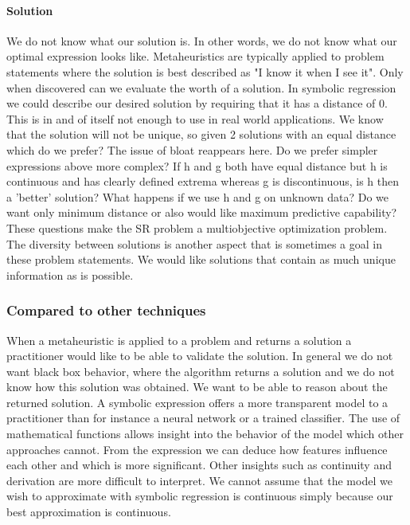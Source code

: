 \paragraph{Solution}
We do not know what our solution is. In other words, we do not know what our optimal expression looks like. Metaheuristics are typically applied to problem statements where the solution is best described as "I know it when I see it". Only when discovered can we evaluate the worth of a solution. In symbolic regression we could describe our desired solution by requiring that it has a distance of 0. This is in and of itself not enough to use in real world applications. We know that the solution will not be unique, so given 2 solutions with an equal distance which do we prefer? The issue of bloat reappears here. Do we prefer simpler expressions above more complex? If h and g both have equal distance but h is continuous and has clearly defined extrema whereas g is discontinuous, is h then a 'better' solution? What happens if we use h and g on unknown data? Do we want only minimum distance or also would like maximum predictive capability? These questions make the SR problem a multiobjective optimization problem. The diversity between solutions is another aspect that is sometimes a goal in these problem statements. We would like solutions that contain as much unique information as is possible. 

\subsubsection{Compared to other techniques}
When a metaheuristic is applied to a problem and returns a solution a practitioner would like to be able to validate the solution. In general we do not want black box behavior, where the algorithm returns a solution and we do not know how this solution was obtained. We want to be able to reason about the returned solution. A symbolic expression offers a more transparent model to a practitioner than for instance a neural network or a trained classifier. The use of mathematical functions allows insight into the behavior of the model which other approaches cannot. From the expression we can deduce how features influence each other and which is more significant. Other insights such as continuity and derivation are more difficult to interpret. We cannot assume that the model we wish to approximate with symbolic regression is continuous simply because our best approximation is continuous.

